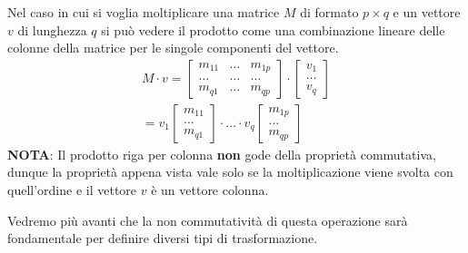 Nel caso in cui si voglia moltiplicare una matrice $M$ di formato $p \times q$ e un
vettore $v$ di lunghezza $q$ si pu\`o vedere il prodotto come una combinazione lineare
delle colonne della matrice per le singole componenti del vettore.
\begin{gather*}
	M \cdot v =
	\begin{bmatrix}
		m_{11} & \dots & m_{1p} \\
		\dots  & \dots & \dots  \\
		m_{q1} & \dots & m_{qp}
	\end{bmatrix} \cdot
	\begin{bmatrix}
		v_1 \\ \dots \\ v_q
	\end{bmatrix} \\
	= v_1 \begin{bmatrix}
		m_{11} \\ \dots \\ m_{q1}
	\end{bmatrix} \cdot
	... \cdot
	v_q \begin{bmatrix}
		m_{1p} \\ \dots \\ m_{qp}
	\end{bmatrix}
\end{gather*}
\textbf{NOTA}: Il prodotto riga per colonna \textbf{non} gode della propriet\`a
commutativa, dunque la propriet\`a appena vista vale solo se la moltiplicazione viene
svolta con quell'ordine e il vettore $v$ \`e un vettore colonna.

Vedremo pi\`u avanti che la non commutativit\`a di questa operazione sar\`a fondamentale
per definire diversi tipi di trasformazione.